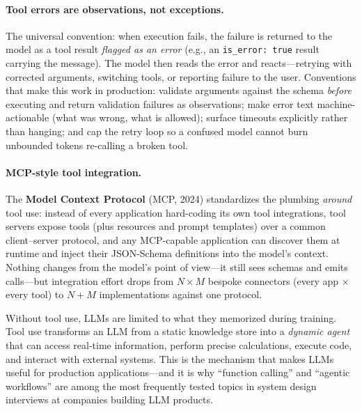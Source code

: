 \paragraph{Tool errors are observations, not exceptions.}
The universal convention: when execution fails, the failure is returned to
the model as a tool result \emph{flagged as an error} (e.g., an
\texttt{is\_error: true} result carrying the message).  The model then
reads the error and reacts---retrying with corrected arguments, switching
tools, or reporting failure to the user.  Conventions that make this work
in production: validate arguments against the schema \emph{before}
executing and return validation failures as observations; make error text
machine-actionable (what was wrong, what is allowed); surface timeouts
explicitly rather than hanging; and cap the retry loop so a confused model
cannot burn unbounded tokens re-calling a broken tool.

\paragraph{MCP-style tool integration.}
The \textbf{Model Context Protocol} (MCP, 2024) standardizes the plumbing
\emph{around} tool use: instead of every application hard-coding its own
tool integrations, tool servers expose tools (plus resources and prompt
templates) over a common client--server protocol, and any MCP-capable
application can discover them at runtime and inject their JSON-Schema
definitions into the model's context.  Nothing changes from the model's
point of view---it still sees schemas and emits calls---but integration
effort drops from $N \times M$ bespoke connectors (every app $\times$
every tool) to $N + M$ implementations against one protocol.

\begin{keyinsight}
Without tool use, LLMs are limited to what they memorized during training.
Tool use transforms an LLM from a static knowledge store into a
\emph{dynamic agent} that can access real-time information, perform precise
calculations, execute code, and interact with external systems.  This is the
mechanism that makes LLMs useful for production applications---and it is why
``function calling'' and ``agentic workflows'' are among the most frequently
tested topics in system design interviews at companies building LLM products.
\end{keyinsight}


